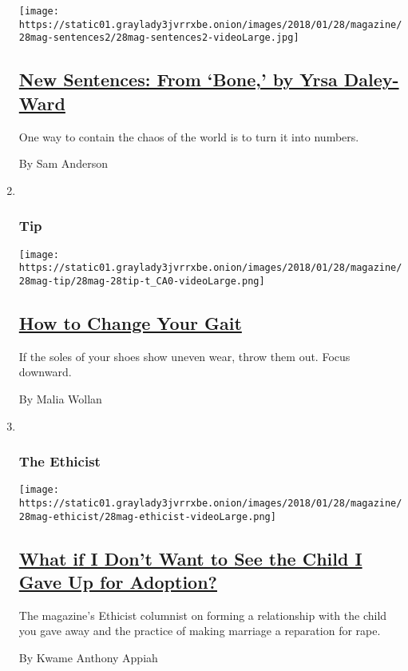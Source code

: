 \begin{enumerate}
  \texttt{[image: https://static01.graylady3jvrrxbe.onion/images/2018/01/28/magazine/28mag-sentences2/28mag-sentences2-videoLarge.jpg]}

  \hypertarget{new-sentences-from-bone-by-yrsa-daley-ward}{%
  \subsection{\texorpdfstring{\href{/2018/01/26/magazine/new-sentences-from-bone-by-yrsa-daley-ward.html}{New
  Sentences: From `Bone,' by Yrsa
  Daley-Ward}}{New Sentences: From `Bone,' by Yrsa Daley-Ward}}\label{new-sentences-from-bone-by-yrsa-daley-ward}}

  One way to contain the chaos of the world is to turn it into numbers.

  By Sam Anderson
\item ~
  \hypertarget{tip}{%
  \subsubsection{Tip}\label{tip}}

  \texttt{[image: https://static01.graylady3jvrrxbe.onion/images/2018/01/28/magazine/28mag-tip/28mag-28tip-t\_CA0-videoLarge.png]}

  \hypertarget{how-to-change-your-gait}{%
  \subsection{\texorpdfstring{\href{/2018/01/26/magazine/how-to-change-your-gait.html}{How
  to Change Your
  Gait}}{How to Change Your Gait}}\label{how-to-change-your-gait}}

  If the soles of your shoes show uneven wear, throw them out. Focus
  downward.

  By Malia Wollan
\item ~
  \hypertarget{the-ethicist}{%
  \subsubsection{The Ethicist}\label{the-ethicist}}

  \texttt{[image: https://static01.graylady3jvrrxbe.onion/images/2018/01/28/magazine/28mag-ethicist/28mag-ethicist-videoLarge.png]}

  \hypertarget{what-if-i-dont-want-to-see-the-child-i-gave-up-for-adoption}{%
  \subsection{\texorpdfstring{\href{/2018/01/24/magazine/what-if-i-dont-want-to-see-the-child-i-gave-up-for-adoption.html}{What
  if I Don't Want to See the Child I Gave Up for
  Adoption?}}{What if I Don't Want to See the Child I Gave Up for Adoption?}}\label{what-if-i-dont-want-to-see-the-child-i-gave-up-for-adoption}}

  The magazine's Ethicist columnist on forming a relationship with the
  child you gave away and the practice of making marriage a reparation
  for rape.

  By Kwame Anthony Appiah
\end{enumerate}

